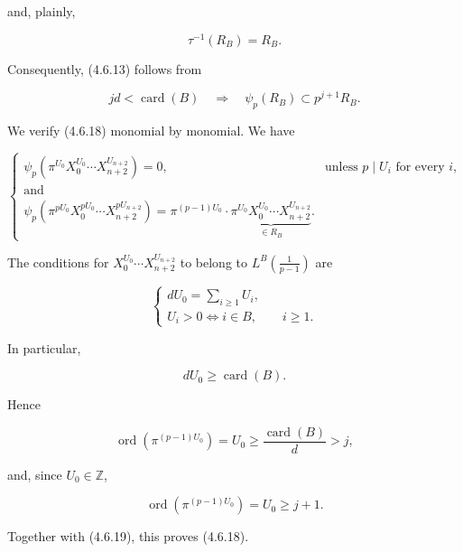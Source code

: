 and, plainly,

\begin{equation}\tag{4.6.17}
\tau^{-1}(R_B)=R_B.
\end{equation}

Consequently, (4.6.13) follows from

\begin{equation}\tag{4.6.18}
jd<\operatorname{card}(B)
\quad\Longrightarrow\quad
\psi_p(R_B)\subset p^{j+1}R_B.
\end{equation}

We verify (4.6.18) monomial by monomial.  We have

\begin{equation}\tag{4.6.19}
\begin{cases}
\psi_p\!\left(\pi^{U_0}X_0^{U_0}\cdots X_{n+2}^{U_{n+2}}\right)=0,
&\text{unless }p\mid U_i\text{ for every }i,\\
\text{and}\\[3pt]
\psi_p\!\left(
\pi^{pU_0}X_0^{pU_0}\cdots X_{n+2}^{pU_{n+2}}
\right)
=\pi^{(p-1)U_0}\cdot
\underbrace{\pi^{U_0}X_0^{U_0}\cdots X_{n+2}^{U_{n+2}}}_{\in R_B}.
\end{cases}
\end{equation}

The conditions for
$X_0^{U_0}\cdots X_{n+2}^{U_{n+2}}$ to belong to
$L^B\!\left(\frac1{p-1}\right)$ are

\begin{equation}\tag{4.6.20}
\begin{cases}
dU_0=\displaystyle\sum_{i\geq1}U_i,\\
U_i>0\Longleftrightarrow i\in B,\qquad i\geq1.
\end{cases}
\end{equation}

In particular,

\begin{equation}\tag{4.6.21}
dU_0\geq\operatorname{card}(B).
\end{equation}

Hence

\begin{equation}\tag{4.6.22}
\operatorname{ord}\!\left(\pi^{(p-1)U_0}\right)
=U_0\geq\frac{\operatorname{card}(B)}d>j,
\end{equation}

and, since $U_0\in\mathbb Z$,

\begin{equation}\tag{4.6.23}
\operatorname{ord}\!\left(\pi^{(p-1)U_0}\right)
=U_0\geq j+1.
\end{equation}

Together with (4.6.19), this proves (4.6.18).

